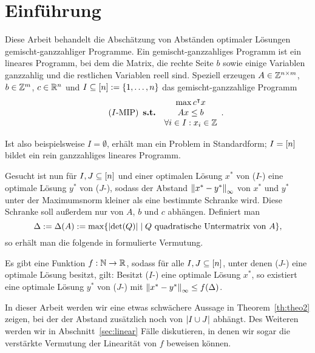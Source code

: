 \section{Einführung}\label{introduction}

Diese Arbeit behandelt die Abschätzung von Abständen optimaler Lösungen
gemischt-ganzzahliger Programme.
Ein gemischt-ganzzahliges Programm ist ein lineares Programm, bei dem die
Matrix, die rechte Seite $b$ sowie einige Variablen ganzzahlig und die
restlichen Variablen reell sind.
Speziell erzeugen $A\in\mathbb{Z}^{n\times m}$, $b\in\mathbb{Z}^m$, $c\in\mathbb{R}^n$ und $I\subseteq[n]:=\{1,\dots,n\}$ das gemischt-ganzzahlige Programm
\begin{equation}\tag{$I$-\MIP}
\begin{array}{lc}
	&\max c\transpose x \\
	\subjectTo &Ax\leq b\\
	&\forall i\in I: x_i\in\Z
\end{array}.
\end{equation}

Ist also beispielsweise $I=\emptyset$, erhält man ein Problem in Standardform; $I=[n]$ bildet ein rein ganzzahliges lineares Programm.

Gesucht ist nun für $I,J\subseteq[n]$ und einer optimalen Lösung
$x^*$ von ($I$-\MIP) eine optimale Lösung $y^*$ von ($J$-\MIP), sodass der Abstand $\left\lVert x^*-y^*\right\rVert_\infty$ von $x^*$ und $y^*$ unter der Maximumsnorm kleiner als eine bestimmte Schranke wird.
Diese Schranke soll außerdem nur von $A$, $b$ und $c$ abhängen.
Definiert man
$$\Delta:=\Delta(A):=\max\{\lvert  \det(Q) \rvert \mid Q \text{ quadratische Untermatrix von } A \},$$
so erhält man die folgende in \cite{Paat2018} formulierte Vermutung.

\begin{conjecture}
	Es gibt eine Funktion $f: \mathbb{N}\rightarrow\mathbb{R}$, sodass für alle $I,J\subseteq[n]$, unter denen ($J$-\MIP) eine optimale Lösung besitzt, gilt:
	Besitzt ($I$-\MIP) eine optimale Lösung $x^*$, so existiert eine optimale 
	Lösung $y^*$ von ($J$-\MIP) mit $\left\lVert x^* - y^*\right\rVert_\infty\leq f(\Delta)$.
\end{conjecture}

In dieser Arbeit werden wir eine etwas schwächere Aussage in Theorem~\ref{th:theo2} zeigen, bei der der Abstand zusätzlich noch von $\lvert I\cup J \rvert$ abhängt.
Des Weiteren werden wir in Abschnitt~\ref{sec:linear} Fälle diskutieren, in denen wir sogar die verstärkte Vermutung der Linearität von $f$ beweisen können.
